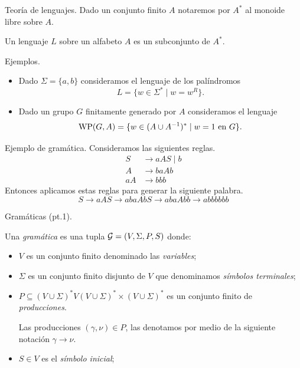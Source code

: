 \documentclass[aspectratio=169, 11pt]{beamer}
\begin{document}
	\begin{frame}[fragile]{Teoría de lenguajes.}
		Dado un conjunto finito $A$ notaremos por $A^*$ al monoide libre sobre $A$.
		
		\begin{deff}
			Un lenguaje $L$ sobre un alfabeto $A$ es un subconjunto de $A^*$.
		\end{deff}	
		
		\begin{alertblock}{Ejemplos.}
			\begin{itemize}
				\item 
					Dado $\Sigma = \{a,b\}$ consideramos el lenguaje de los palíndromos
					\[
						L = \{ w \in \Sigma^{*} \mid w = w^{R}  \}.
					\]
				\item 
					Dado un grupo $G$ finitamente generado por $A$ consideramos el lenguaje
					\[
						\text{WP}(G, A) = \{ w \in (A \cup A^{-1})^{*} \mid w = 1 \ \text{en $G$} \}.	
					\]
			\end{itemize}
		\end{alertblock}
	\end{frame}
	
	\begin{frame}[fragile]{Ejemplo de gramática.}
		Consideramos las siguientes reglas.
		\begin{align*}
			S  & \to aAS \mid b \\
			A  & \to baAb \\
			aA & \to bbb
		\end{align*}
		Entonces aplicamos estas reglas para generar la siguiente palabra.
		\[
			S \to aAS \to abaAbS \to abaAbb \to abbbbbb	
		\]
	\end{frame}

	\begin{frame}[fragile]{Gramáticas (pt.1).}
		\begin{deff}
			Una \emph{gramática} es una tupla ${\cal G} = (V, \Sigma, P, S)$ donde:
				\begin{itemize}
					\item $V$ es un conjunto finito denominado las \emph{variables};
					\item $\Sigma$ es un conjunto finito disjunto de $V$ que denominamos \emph{símbolos terminales};
					\item $P \subseteq (V \cup \Sigma)^*V(V \cup \Sigma)^* \times (V \cup \Sigma)^*$ es un conjunto finito de \emph{producciones}.
					
					Las producciones $(\gamma, \nu) \in P$, las denotamos por medio de la siguiente notación $\gamma \to \nu$.
					\item $S \in V$ es el \emph{símbolo inicial};
				\end{itemize}
		\end{deff}
	\end{frame}
	
\end{document}
